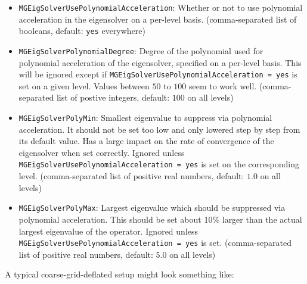 \begin{itemize}
  \item{ \texttt{MGEigSolverUsePolynomialAcceleration}: Whether or not to use polynomial acceleration in the eigensolver on a per-level basis. (comma-separated list of booleans, default: \texttt{yes} everywhere)}
  \item{ \texttt{MGEigSolverPolynomialDegree}: Degree of the polynomial used for polynomial acceleration of the eigensolver, specified on a per-level basis. This will be ignored except if \texttt{MGEigSolverUsePolynomialAcceleration = yes} is set on a given level. Values between $50$ to $100$ seem to work well. (comma-separated list of postive integers, default: $100$ on all levels)}
  \item{ \texttt{MGEigSolverPolyMin}: Smallest eigenvalue to suppress via polynomial acceleration. It should not be set too low and only lowered step by step from its default value. Has a large impact on the rate of convergence of the eigensolver when set correctly. Ignored unless \texttt{MGEigSolverUsePolynomialAcceleration = yes} is set on the corresponding level. (comma-separated list of positive real numbers, default: $1.0$ on all levels)}
  \item{ \texttt{MGEigSolverPolyMax}: Largest eigenvalue which should be suppressed via polynomial acceleration. This should be set about 10\% larger than the actual largest eigenvalue of the operator. Ignored unless \texttt{MGEigSolverUsePolynomialAcceleration = yes} is set. (comma-separated list of positive real numbers, default: $5.0$ on all levels)}
\end{itemize}

A typical coarse-grid-deflated setup might look something like:

